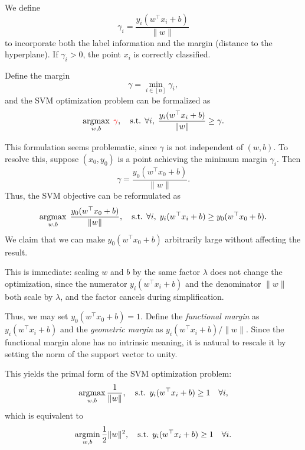\documentclass[../main]{subfiles}
\begin{document}
We define
\begin{equation}
    \gamma_i = \frac{y_i(w^\top x_i + b)}{\|w\|}
\end{equation}
to incorporate both the label information and the margin (distance to the hyperplane).  
If $\gamma_i > 0$, the point $x_i$ is correctly classified.  

Define the margin
\begin{equation}
    \gamma = \min_{i \in [n]} \gamma_i,
\end{equation}
and the SVM optimization problem can be formalized as
\begin{equation}
    \mathop{\mathrm{argmax}}_{w,b} \; {\color{red}{\gamma}}, 
    \quad \text{s.t. } \forall i, \; \frac{y_i (w^\top x_i + b)}{\|w\|} \geq \gamma.
\end{equation}

This formulation seems problematic, since $\gamma$ is not independent of $(w,b)$.  
To resolve this, suppose $(x_0, y_0)$ is a point achieving the minimum margin $\gamma_i$.  
Then
\begin{equation}
    \gamma = \frac{y_0 (w^\top x_0 + b)}{\|w\|}.
\end{equation}
Thus, the SVM objective can be reformulated as
\begin{equation}
    \mathop{\mathrm{argmax}}_{w,b} \; \frac{y_0 (w^\top x_0 + b)}{\|w\|}, 
    \quad \text{s.t. } \forall i, \; y_i (w^\top x_i + b) \geq y_0 (w^\top x_0 + b).
\end{equation}
We claim that we can make $y_0(w^\top x_0 + b)$ arbitrarily large without affecting the result.

\begin{remark}
    This is immediate: scaling $w$ and $b$ by the same factor $\lambda$ does not change the optimization, since the numerator $y_i(w^\top x_i + b)$ and the denominator $\|w\|$ both scale by $\lambda$, and the factor cancels during simplification.
\end{remark}

Thus, we may set $y_0(w^\top x_0 + b) = 1$.  
Define the \emph{functional margin} as $y_i(w^\top x_i + b)$ and the \emph{geometric margin} as $y_i(w^\top x_i + b)/\|w\|$.  
Since the functional margin alone has no intrinsic meaning, it is natural to rescale it by setting the norm of the support vector to unity.  

This yields the primal form of the SVM optimization problem:
\begin{equation}
    \mathop{\mathrm{argmax}}_{w,b} \frac{1}{\|w\|}, 
    \quad \text{s.t. } y_i (w^\top x_i + b) \geq 1 \quad \forall i,
\end{equation}
which is equivalent to
\begin{equation}
    \mathop{\mathrm{argmin}}_{w,b} \frac{1}{2} \|w\|^2, 
    \quad \text{s.t. } y_i (w^\top x_i + b) \geq 1 \quad \forall i.
\end{equation}
\end{document}
